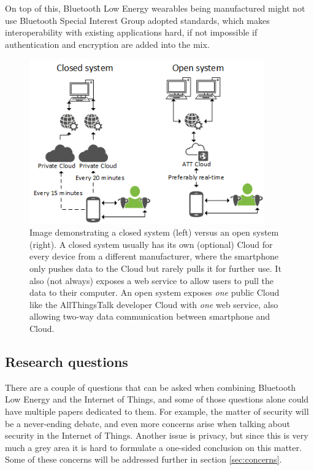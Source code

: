 \documentclass[pdftex,a4paper,12pt,twoside]{report}
\begin{document}
On top of this, Bluetooth Low Energy wearables being manufactured might not use Bluetooth Special Interest Group adopted standards, which makes interoperability with existing applications hard, if not impossible if authentication and encryption are added into the mix.

\begin{figure}[h]
    \centering
    \includegraphics[width=0.9\textwidth]{img/networkloop.png}
    \caption[Image demonstrating a closed Cloud system versus an open Cloud system]{Image demonstrating a closed system (left) versus an open system (right). A closed system usually has its own (optional) Cloud for every device from a different manufacturer, where the smartphone only pushes data to the Cloud but rarely pulls it for further use. It also (not always) exposes a web service to allow users to pull the data to their computer. An open system exposes \textit{one} public Cloud like the AllThingsTalk developer Cloud with \textit{one} web service, also allowing two-way data communication between smartphone and Cloud.}
    \label{fig:networkloops}
\end{figure}

\subsection{Research questions}
\label{subsec:researchquestions}
There are a couple of questions that can be asked when combining Bluetooth Low Energy and the Internet of Things, and some of those questions alone could have multiple papers dedicated to them. For example, the matter of security will be a never-ending debate, and even more concerns arise when talking about security in the Internet of Things. Another issue is privacy, but since this is very much a grey area it is hard to formulate a one-sided conclusion on this matter. Some of these concerns will be addressed further in section \ref{sec:concerns}.
\end{document}
